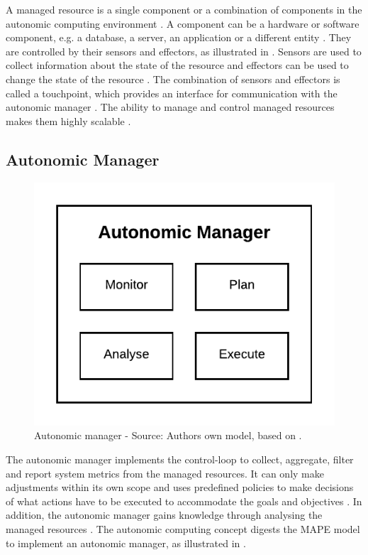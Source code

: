 A managed resource is a single component or a combination of components in the autonomic computing environment \cite{Murch2004Autonomic, Jacob2004AutonomicSolution}. A component can be a hardware or software component, e.g. a database, a server, an application or a different entity \cite{Sinreich2006AnAB}.
They are controlled by their sensors and effectors, as illustrated in . Sensors are used to collect information about the state of the resource and effectors can be used to change the state of the resource \cite{Jacob2004AutonomicSolution}. The combination of sensors and effectors is called a touchpoint, which provides an interface for communication with the autonomic manager \cite{Sinreich2006AnAB}.
The ability to manage and control managed resources makes them highly scalable \cite{Murch2004Autonomic}.


\subsection{Autonomic Manager}
\label{subsec:02_ac_manager}

\begin{figure}[h]
\centering
\includegraphics[scale=1]{images/02_theoretical_foundation/autonomic_computing/autonomic_manager}
\caption{Autonomic manager - Source: Authors own model, based on \cite{Jacob2004AutonomicSolution}.}
\label{fig:ac_manager}
\end{figure}

The autonomic manager implements the control-loop to collect, aggregate, filter and report system metrics from the managed resources. It can only make adjustments within its own scope and uses predefined policies to make decisions of what actions have to be executed to accommodate the goals and objectives \cite{Murch2004Autonomic, Sinreich2006AnAB}.
In addition, the autonomic manager gains knowledge through analysing the managed resources \cite{Murch2004Autonomic}.
The autonomic computing concept digests the MAPE model to implement an autonomic manager, as illustrated in  \cite{Goscinski2011CloudComputing}.

